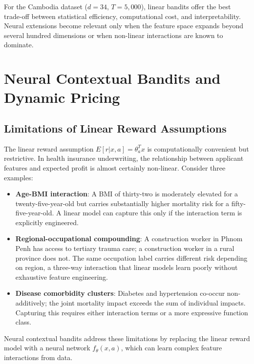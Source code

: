For the Cambodia dataset (\(d = 34\), \(T = 5,000\)), linear bandits offer the best trade-off between statistical efficiency, computational cost, and interpretability. Neural extensions become relevant only when the feature space expands beyond several hundred dimensions or when non-linear interactions are known to dominate.

\section{Neural Contextual Bandits and Dynamic Pricing}\label{neural-contextual-bandits-and-dynamic-pricing}

\subsection{Limitations of Linear Reward Assumptions}\label{limitations-of-linear-reward-assumptions}

The linear reward assumption \(E[r | x, a] = \theta_a^T x\) is computationally convenient but restrictive. In health insurance underwriting, the relationship between applicant features and expected profit is almost certainly non-linear. Consider three examples:

\begin{itemize}
\tightlist
\item
  \textbf{Age-BMI interaction}: A BMI of thirty-two is moderately elevated for a twenty-five-year-old but carries substantially higher mortality risk for a fifty-five-year-old. A linear model can capture this only if the interaction term is explicitly engineered.
\item
  \textbf{Regional-occupational compounding}: A construction worker in Phnom Penh has access to tertiary trauma care; a construction worker in a rural province does not. The same occupation label carries different risk depending on region, a three-way interaction that linear models learn poorly without exhaustive feature engineering.
\item
  \textbf{Disease comorbidity clusters}: Diabetes and hypertension co-occur non-additively; the joint mortality impact exceeds the sum of individual impacts. Capturing this requires either interaction terms or a more expressive function class.
\end{itemize}

Neural contextual bandits address these limitations by replacing the linear reward model with a neural network \(f_\theta(x, a)\), which can learn complex feature interactions from data.

